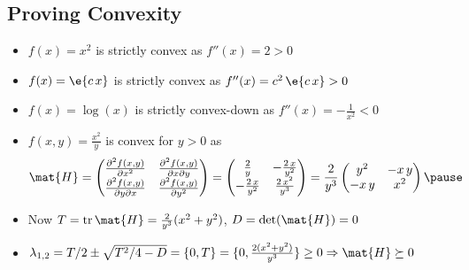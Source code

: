 
\begin{slide}
\section[-2]{Proving Convexity}

\begin{PauseHighLight}\squeeze
  \begin{itemize}
  \item $f(x)=x^2$ is strictly convex as $f''(x)=2>0$\pause
  \item $f(x)=\e{c\,x}$ is strictly convex as $f''(x) =
    c^2\,\e{c\,x}>0$\pause
  \item $f(x) = \log(x)$ is strictly convex-down
    as $f''(x)=-\frac{1}{x^2}<0$\pause
  \item $f(x,y) = \frac{x^2}{y}$ is convex for $y>0$ as
    \begin{align*}
      \mat{H} =
      \begin{pmatrix}
        \frac{\partial^2 f(x,y)}{\partial x^2}
        &
        \frac{\partial^2 f(x,y)}{\partial x \partial y}\\
        \frac{\partial^2 f(x,y)}{\partial y \partial x}
        &
        \frac{\partial^2 f(x,y)}{\partial y^2}
      \end{pmatrix}
      =
          \begin{pmatrix}
            \frac{2}{y}
            & -\frac{2\,x}{y^2} \\
            -\frac{2\,x}{y^2}
            & \frac{2\,x^2}{y^3}
          \end{pmatrix}
              = \frac{2}{y^3}
              \begin{pmatrix}
                y^2 & -x\,y \\
                -x\,y & x^2
              \end{pmatrix}\pause
    \end{align*}
  \item Now $T = \mathrm{tr}\, \mat{H} = \frac{2}{y^3}(x^2+y^2)$, $D =
    \det(\mat{H})=0$\pause
  \item $\lambda_{1,2} =T/2 \pm \sqrt{T^2/4-D} = \{0, T\} =
    \{0,\frac{2(x^2+y^2)}{y^3}\} \geq 0 \Rightarrow \mat{H}\succeq 0$\pause
  \end{itemize}
\end{PauseHighLight}

\end{slide}

